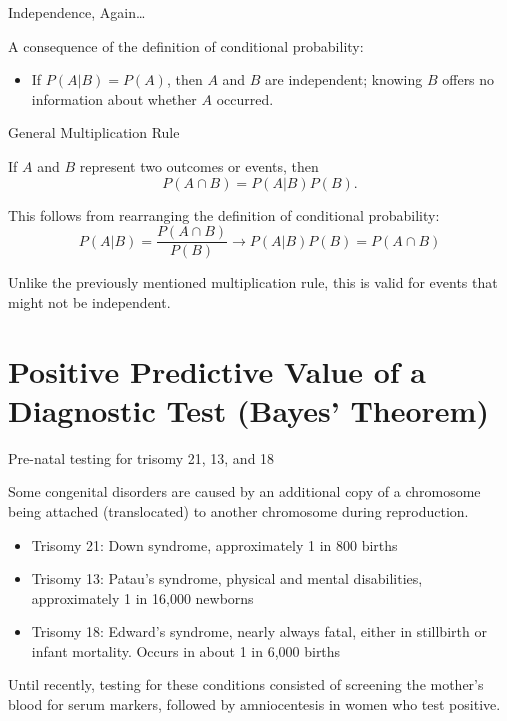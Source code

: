 \documentclass[ignorenonframetext,aspectratio=169]{beamer}
\providecommand{\tightlist}{%
  \setlength{\itemsep}{0pt}\setlength{\parskip}{0pt}}
\begin{document}
\begin{frame}{Independence, Again\ldots{}}

A consequence of the definition of conditional probability:

\begin{itemize}
\tightlist
\item
  If \(P(A|B) = P(A)\), then \(A\) and \(B\) are independent; knowing
  \(B\) offers no information about whether \(A\) occurred.
\end{itemize}

\end{frame}

\begin{frame}{General Multiplication Rule}

If \(A\) and \(B\) represent two outcomes or events, then
\[P(A \cap B) = P(A|B)P(B).\]

This follows from rearranging the definition of conditional probability:
\[P(A|B) = \frac{P(A \cap B)}{P(B)} \rightarrow P(A|B)P(B) = P(A \cap B)\]

Unlike the previously mentioned multiplication rule, this is valid for
events that might not be independent.

\end{frame}

\section{Positive Predictive Value of a Diagnostic Test (Bayes'
Theorem)}\label{positive-predictive-value-of-a-diagnostic-test-bayes-theorem}

\begin{frame}{Pre-natal testing for trisomy 21, 13, and 18}

Some congenital disorders are caused by an additional copy of a
chromosome being attached (translocated) to another chromosome during
reproduction.

\begin{itemize}
\item
  Trisomy 21: Down syndrome, approximately 1 in 800 births
\item
  Trisomy 13: Patau's syndrome, physical and mental disabilities,
  approximately 1 in 16,000 newborns
\item
  Trisomy 18: Edward's syndrome, nearly always fatal, either in
  stillbirth or infant mortality. Occurs in about 1 in 6,000 births
\end{itemize}

Until recently, testing for these conditions consisted of screening the
mother's blood for serum markers, followed by amniocentesis in women who
test positive.

\end{frame}
\end{document}
